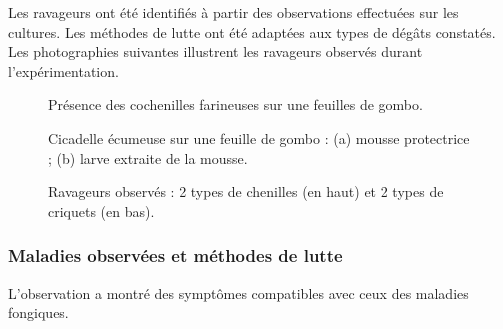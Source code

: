 Les ravageurs ont été identifiés à partir des observations effectuées sur les cultures. Les méthodes de lutte ont été adaptées aux types de dégâts constatés. Les photographies suivantes illustrent les ravageurs observés durant l’expérimentation.

    \begin{figure}[H]
    \centering
    \caption{Présence des cochenilles farineuses sur une feuilles de gombo. }
    \label{fig:cochenille3}
\end{figure}

    \begin{figure}[H]
    \centering
    \caption{Cicadelle écumeuse sur une feuille de gombo : (a) mousse protectrice ; (b) larve extraite de la mousse. }
    \label{fig:cicadelle}
\end{figure}

\begin{figure}[H]
    \centering
    \caption{Ravageurs observés : 2 types de chenilles (en haut) et 2 types de criquets (en bas). }
    \label{fig:chenille3}
\end{figure}

\subsubsection{Maladies observées et méthodes de lutte}
L'observation a montré des symptômes compatibles avec ceux des maladies fongiques.

